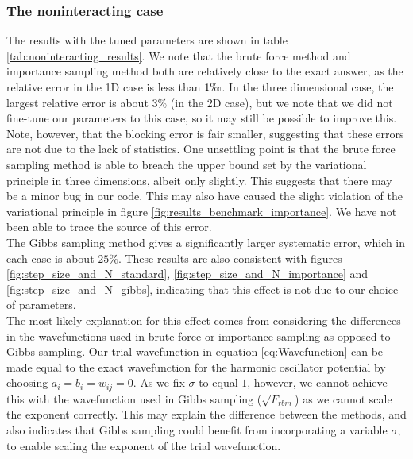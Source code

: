\documentclass[a4paper, 10pt]{article}
\begin{document}
\subsubsection{The noninteracting case}\label{sec:disc_result_noninteracting}
The results with the tuned parameters are shown in table \ref{tab:noninteracting_results}. We note that the brute force method and importance sampling method both are relatively close to the exact answer, as the relative error in the 1D case is less than $1 \permil$. In the three dimensional case, the largest relative error is about $3\%$ (in the 2D case), but we note that we did not fine-tune our parameters to this case, so it may still be possible to improve this. Note, however, that the blocking error is fair smaller, suggesting that these errors are not due to the lack of statistics. One unsettling point is that the brute force sampling method is able to breach the upper bound set by the variational principle in three dimensions, albeit only slightly. This suggests that there may be a minor bug in our code. This may also have caused the slight violation of the variational principle in figure \ref{fig:results_benchmark_importance}. We have not been able to trace the source of this error.\\
\linebreak
The Gibbs sampling method gives a significantly larger systematic error, which in each case is about $25\%$. These results are also consistent with figures \ref{fig:step_size_and_N_standard}, \ref{fig:step_size_and_N_importance} and \ref{fig:step_size_and_N_gibbs}, indicating that this effect is not due to our choice of parameters.\\
\linebreak
The most likely explanation for this effect comes from considering the differences in the wavefunctions used in brute force or importance sampling as opposed to Gibbs sampling. Our trial wavefunction in equation \ref{eq:Wavefunction} can be made equal to the exact wavefunction for the harmonic oscillator potential by choosing $a_i=b_i=w_{ij}=0$. As we fix $\sigma$ to equal $1$, however, we cannot achieve this with the wavefunction used in Gibbs sampling ($\sqrt{F_{rbm}}$) as we cannot scale the exponent correctly. This may explain the difference between the methods, and also indicates that Gibbs sampling could benefit from incorporating a variable $\sigma$, to enable scaling the exponent of the trial wavefunction.
\end{document}
